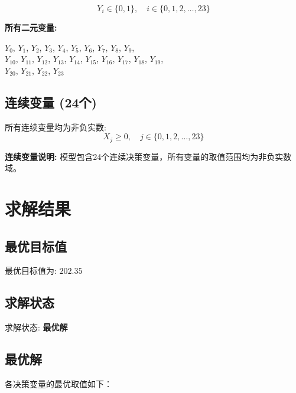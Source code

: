 \documentclass[a4paper,10pt]{article}
\begin{document}
\begin{equation}
Y_i \in \{0,1\}, \quad i \in \{0, 1, 2, \ldots, 23\}
\end{equation}

\textbf{所有二元变量:}

{\small
$Y_{0}$, $Y_{1}$, $Y_{2}$, $Y_{3}$, $Y_{4}$, $Y_{5}$, $Y_{6}$, $Y_{7}$, $Y_{8}$, $Y_{9}$, \\
$Y_{10}$, $Y_{11}$, $Y_{12}$, $Y_{13}$, $Y_{14}$, $Y_{15}$, $Y_{16}$, $Y_{17}$, $Y_{18}$, $Y_{19}$, \\
$Y_{20}$, $Y_{21}$, $Y_{22}$, $Y_{23}$
}

\subsection{连续变量 (24个)}

所有连续变量均为非负实数:
\begin{equation}
X_j \geq 0, \quad j \in \{0, 1, 2, \ldots, 23\}
\end{equation}

\textbf{连续变量说明:} 模型包含24个连续决策变量，所有变量的取值范围均为非负实数域。

\section{求解结果}

\subsection{最优目标值}

最优目标值为: $\mathbf{202.35}$

\subsection{求解状态}

求解状态: \textbf{最优解}

\subsection{最优解}

各决策变量的最优取值如下：
\end{document}
